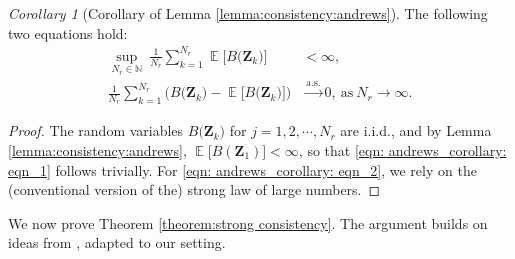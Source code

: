 \documentclass[11pt]{article}
\newcommand{\jp}[1]{\footnote{J-P: #1}}
\theoremstyle{remark}
\newtheorem{corlly}[thm]{Corollary}
\theoremstyle{definition}
\DeclareMathOperator{\exptn}{\mathbb{E}}
\newcommand{\bs}[1]{{\boldsymbol #1 }}
\numberwithin{equation}{section}
\begin{document}
\begin{corlly}[Corollary of Lemma \ref{lemma:consistency:andrews}] The following two equations hold:
    \begin{align}
        \sup_{N_r \in \mathbb{N}} \ \frac{1}{N_r} \sum_{k=1}^{N_r} \exptn\big[B\big(\bs{Z}_k\big)\big] &< \infty, \label{eqn: andrews_corollary: eqn_1}
        \\
        \frac{1}{N_r} \sum_{k=1}^{N_r} \Big(B\big(\bs{Z}_k\big) - \exptn\big[B\big(\bs{Z}_k\big)\big]\Big) &\overset{\text{a.s.}}{\longrightarrow} 0, \ \text{as} \ N_r \rightarrow \infty. \label{eqn: andrews_corollary: eqn_2}
    \end{align}
\end{corlly}
\begin{proof}
    The random variables $B\big(\bs{Z}_k\big)$ for $j = 1,2,\cdots, N_r$ are i.i.d., and by Lemma \ref{lemma:consistency:andrews}, $\exptn \big[B(\bs{Z}_1)\big] < \infty$, so that \eqref{eqn: andrews_corollary: eqn_1} follows trivially. For \eqref{eqn: andrews_corollary: eqn_2}, we rely on the (conventional version of the) strong law of large numbers.
\end{proof}

We now prove Theorem \ref{theorem:strong consistency}. The argument builds on ideas from \cite[Theorem 3.1]{bodas2023}, adapted to our setting. %
\end{document}
